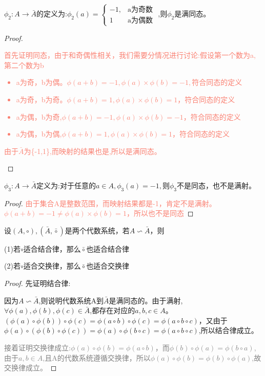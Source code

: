 \documentclass[
	11pt, %
	fleqn, %
	a4paper, %
]{LegrandOrangeBook}
\begin{document}
\begin{example}
	$\phi_2:A\rightarrow\bar{A}$的定义为:$\phi_2(a)=\begin{cases}
			-1, & \text{a为奇数} \\
			1   & \text{a为偶数}
		\end{cases}$
	,则$\phi_2$是满同态。
\end{example}

\begin{proof}
	\textcolor{Salmon}{首先证明同态，由于和奇偶性相关，我们需要分情况进行讨论:假设第一个数为a,第二个数为b
		\begin{itemize}
			\item a为奇，b为偶。$\phi(a+b)=-1,\phi(a)\times\phi(b)=-1,$符合同态的定义
			\item a为奇，b为奇。$\phi(a+b)=1,\phi(a)\times\phi(b)=1$，符合同态的定义
			\item a为偶，b为奇,$\phi(a+b)=-1,\phi(a)\times\phi(b)=-1$，符合同态的定义
			\item a为偶，b为偶,$\phi(a+b)=1,\phi(a)\times\phi(b)=1$，符合同态的定义
		\end{itemize}
		由于$\bar{A}$为\{-1,1\},而映射的结果也是,所以是满同态。
	}
\end{proof}

\begin{example}
	$\phi_3:A\rightarrow\bar{A}$定义为:对于任意的$a\in A,\phi_3(a)=-1,则\phi_3$不是同态，也不是满射。
\end{example}

\begin{proof}
	\textcolor{Salmon}{由于集合A是整数范围，而映射结果都是-1，肯定不是满射。$\phi(a+b)=-1\not=\phi(a)\times\phi(b)=1$，所以也不是同态}
\end{proof}

\begin{theorem}
	设$(A,\circ),(\bar{A},\bar{\circ})$是两个代数系统，若$A\backsim \bar{A}$，则

	(1)若$\circ$适合结合律，那么$\bar{\circ}$也适合结合律

	(2)若$\circ$适合交换律，那么$\bar{\circ}$也适合交换律
\end{theorem}
\begin{proof}

	先证明结合律:

	因为$A\backsim\bar{A}$,则说明代数系统A到$\bar{A}$是满同态的。由于满射,$\forall \phi(a),\phi(b),\phi(c)\in \bar{A}$,都存在对应的$a,b,c\in A$。$(\phi(a)\circ\phi(b))\circ\phi(c)=\phi(a\circ b)\circ\phi(c)=\phi(a\circ b\circ c)$，又由于$\phi(a)\circ(\phi(b)\circ\phi(c))=\phi(a)\circ\phi(b\circ c)=\phi(a\circ b\circ c)$,所以结合律成立。

	\textcolor{gray}{接着证明交换律成立:$\phi(a)\circ\phi(b)=\phi(a\circ b)$，而$\phi(b)\circ\phi(a)=\phi(b\circ a)$,由于$a,b\in A$,且A的代数系统遵循交换律，所以$\phi(a)\circ\phi(b)=\phi(b)\circ\phi(a)$,故交换律成立。}
\end{proof}
\end{document}
